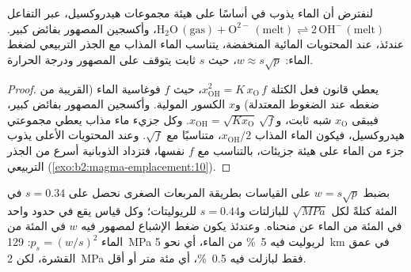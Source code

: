 \begin{proposition}\label{prop:b2:magma-emplacement:sqrt}
لنفترض أن الماء يذوب في  أساسًا على هيئة مجموعات هيدروكسيل، عبر
التفاعل $\mathrm{H_2O\,(gas)} + \mathrm{O^{2-}\,(melt)} \rightleftharpoons
2\,\mathrm{OH^-\,(melt)}$، وأكسجين المصهور بفائض كبير. عندئذ، عند
المحتويات المائية المنخفضة، يتناسب الماء المذاب مع الجذر التربيعي
لضغط الماء: $w \approx s\sqrt{p}$، حيث $s$ ثابت يتوقف على المصهور
ودرجة الحرارة.
\end{proposition}

\begin{proof}
يعطي قانون فعل الكتلة $x_{\mathrm{OH}}^2 = K\,x_{\mathrm{O}}\,f$، حيث $f$
فوغاسية الماء (القريبة من ضغطه عند الضغوط المعتدلة) و$x$
الكسور المولية. وأكسجين المصهور بفائض كبير، فيبقى
$x_{\mathrm{O}}$ شبه ثابت، و$x_{\mathrm{OH}} = \sqrt{Kx_{\mathrm{O}}}\,
\sqrt f$. وكل جزيء ماء مذاب يعطي مجموعتي هيدروكسيل، فيكون الماء المذاب
$x_{\mathrm{OH}}/2$، متناسبًا مع $\sqrt f$. وعند المحتويات الأعلى يذوب جزء
من الماء على هيئة جزيئات، بالتناسب مع $f$ نفسها، فتزداد
الذوبانية أسرع من الجذر التربيعي (\cref{exo:b2:magma-emplacement:10}).
\end{proof}

بضبط $w = s\sqrt p$ على القياسات بطريقة المربعات الصغرى نحصل على
$s = 0.34$ في المئة كتلةً لكل $\sqrt{\unit{MPa}}$ للبازلتات
و$s = 0.44$ للريوليتات؛ وكل قياس يقع في حدود واحد في المئة من
الماء عن منحناه. وعندئذ يكون ضغط الإشباع لمصهور فيه $w$ في المئة
من الماء $p_s = (w/s)^2$: \qty{129}{MPa} لريوليت فيه
\qty{5}{\percent} من الماء، أي نحو \qty{5}{km} في عمق القشرة، لكن
\qty{2}{MPa} فقط لبازلت فيه \qty{0.5}{\percent}، أي مئة متر أو أقل.

